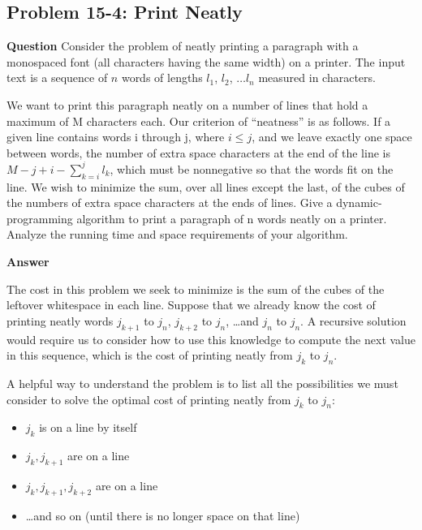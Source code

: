 \documentclass[]{book}
\theoremstyle{definition}
\begin{document}
\subsection*{Problem 15-4: Print Neatly}

\textbf{Question} 
    Consider the problem of neatly printing a paragraph with a monospaced font (all
    characters having the same width) on a printer. The input text is a sequence of
    $n$ words of lengths $l_1$, $l_2$, $\dots l_n$ measured in characters.

    We want to print this paragraph neatly on a number of lines that hold a 
    maximum of M characters each. 
    Our criterion of ``neatness'' is as follows. 
    If a given line contains words i through j, where $i \leq j$,
    and we leave exactly one space between words, the number of extra
    space characters at the end of the line is
    $M - j + i - \sum_{k=i}^j l_k$,
    which must be nonnegative so that the words fit on the line. 
    We wish to minimize the sum, over
    all lines except the last, of the cubes of the numbers of extra space characters at the
    ends of lines. Give a dynamic-programming algorithm to print a paragraph of n
    words neatly on a printer. Analyze the running time and space requirements of
    your algorithm.

\textbf{Answer}

    The cost in this problem we seek to minimize is the sum of the
    cubes of the leftover whitespace in each line. Suppose that
    we already know the cost of printing neatly words 
    $j_{k+1}$ to $j_n$, $j_{k+2}$ to $j_n$, \dots and $j_n$ to $j_n$.
    A recursive solution would require us to consider how
    to use this knowledge to compute the next value in this sequence,
    which is the cost of printing neatly from $j_{k}$ to $j_n$.

    A helpful way to understand the problem is to list all the
    possibilities we must consider to solve the optimal cost of
    printing neatly from $j_{k}$ to $j_n$:

    \begin{itemize}
        \item $j_{k}$ is on a line by itself
        \item $j_{k}, j_{k+1}$ are on a line
        \item $j_{k}, j_{k+1}, j_{k+2}$ are on a line
        \item \dots and so on (until there is no longer space on that line)
    \end{itemize}
\end{document}
